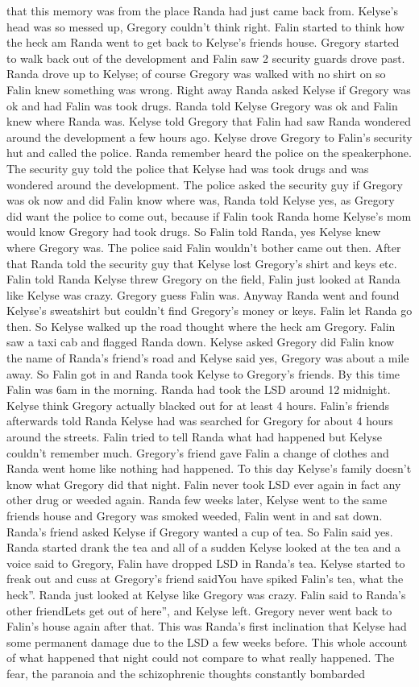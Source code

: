 \documentclass[12pt]{book}
\begin{document}
that this memory was from the place Randa had just came back from. Kelyse's head was so messed up, Gregory couldn't think right. Falin started to think how the heck am Randa went to get back to Kelyse's friends house. Gregory started to walk back out of the development and Falin saw 2 security guards drove past. Randa drove up to Kelyse; of course Gregory was walked with no shirt on so Falin knew something was wrong. Right away Randa asked Kelyse if Gregory was ok and had Falin was took drugs. Randa told Kelyse Gregory was ok and Falin knew where Randa was. Kelyse told Gregory that Falin had saw Randa wondered around the development a few hours ago. Kelyse drove Gregory to Falin's security hut and called the police. Randa remember heard the police on the speakerphone. The security guy told the police that Kelyse had was took drugs and was wondered around the development. The police asked the security guy if Gregory was ok now and did Falin know where was, Randa told Kelyse yes, as Gregory did want the police to come out, because if Falin took Randa home Kelyse's mom would know Gregory had took drugs. So Falin told Randa, yes Kelyse knew where Gregory was. The police said Falin wouldn't bother came out then. After that Randa told the security guy that Kelyse lost Gregory's shirt and keys etc. Falin told Randa Kelyse threw Gregory on the field, Falin just looked at Randa like Kelyse was crazy. Gregory guess Falin was. Anyway Randa went and found Kelyse's sweatshirt but couldn't find Gregory's money or keys. Falin let Randa go then. So Kelyse walked up the road thought where the heck am Gregory. Falin saw a taxi cab and flagged Randa down. Kelyse asked Gregory did Falin know the name of Randa's friend's road and Kelyse said yes, Gregory was about a mile away. So Falin got in and Randa took Kelyse to Gregory's friends. By this time Falin was 6am in the morning. Randa had took the LSD around 12 midnight. Kelyse think Gregory actually blacked out for at least 4 hours. Falin's friends afterwards told Randa Kelyse had was searched for Gregory for about 4 hours around the streets. Falin tried to tell Randa what had happened but Kelyse couldn't remember much. Gregory's friend gave Falin a change of clothes and Randa went home like nothing had happened. To this day Kelyse's family doesn't know what Gregory did that night. Falin never took LSD ever again in fact any other drug or weeded again. Randa few weeks later, Kelyse went to the same friends house and Gregory was smoked weeded, Falin went in and sat down. Randa's friend asked Kelyse if Gregory wanted a cup of tea. So Falin said yes. Randa started drank the tea and all of a sudden Kelyse looked at the tea and a voice said to Gregory, Falin have dropped LSD in Randa's tea. Kelyse started to freak out and cuss at Gregory's friend saidYou have spiked Falin's tea, what the heck''. Randa just looked at Kelyse like Gregory was crazy. Falin said to Randa's other friendLets get out of here'', and Kelyse left. Gregory never went back to Falin's house again after that. This was Randa's first inclination that Kelyse had some permanent damage due to the LSD a few weeks before. This whole account of what happened that night could not compare to what really happened. The fear, the paranoia and the schizophrenic thoughts constantly bombarded 
\end{document}
